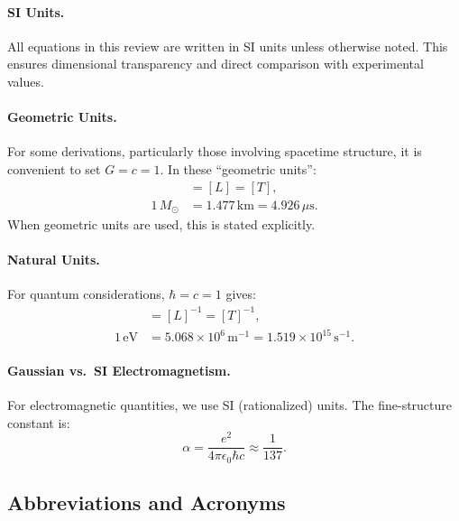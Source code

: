 \paragraph{SI Units.}
All equations in this review are written in SI units unless otherwise noted. 
This ensures dimensional transparency and direct comparison with experimental 
values.

\paragraph{Geometric Units.}
For some derivations, particularly those involving spacetime structure, 
it is convenient to set $G = c = 1$. In these ``geometric units'':
\begin{align}
[M] &= [L] = [T], \\
1\,M_\odot &= 1.477\,\text{km} = 4.926\,\mu\text{s}.
\end{align}
When geometric units are used, this is stated explicitly.

\paragraph{Natural Units.}
For quantum considerations, $\hbar = c = 1$ gives:
\begin{align}
[M] &= [L]^{-1} = [T]^{-1}, \\
1\,\text{eV} &= 5.068 \times 10^6\,\text{m}^{-1} = 1.519 \times 10^{15}\,\text{s}^{-1}.
\end{align}

\paragraph{Gaussian vs.\ SI Electromagnetism.}
For electromagnetic quantities, we use SI (rationalized) units. The 
fine-structure constant is:
\begin{equation}
\alpha = \frac{e^2}{4\pi\epsilon_0\hbar c} \approx \frac{1}{137}.
\end{equation}

\subsection{Abbreviations and Acronyms}\label{app:acronyms}

